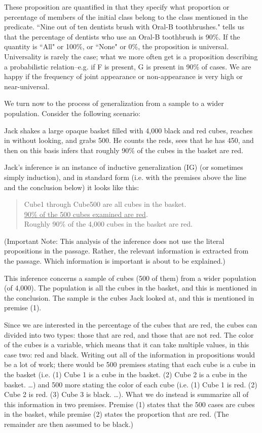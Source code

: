 These proposition are quantified in that they specify what proportion or percentage of members of the initial class belong to the class 
mentioned in the predicate. ``Nine out of ten dentists brush with Oral-B toothbrushes." tells us that the percentage of dentists who use an 
Oral-B toothbrush is 90\%. 
If the quantity is ``All" or 100\%, 
or ``None" or 0\%, 
the proposition is universal. Universality is rarely the case; 
what we more often get is a proposition describing a probabilistic relation--e.g. if F is present, G is present in 90\% 
of cases. We are happy 
if the frequency of joint appearance or non-appearance is very high or near-universal.

We turn now to the process of generalization from a sample to a wider population. Consider the following scenario:

Jack shakes a large opaque basket filled with 4,000 black and red cubes, reaches in without looking, and grabs 500. He counts the reds, sees 
that he has 450, and then on this basis infers that roughly 90\% 
of the cubes in the basket are red.

Jack's inference is an instance of inductive generalization (IG) (or sometimes simply induction), and in standard form (i.e. with the 
premises above the line and the conclusion below) it looks like this:

\begin{quote}
Cube1 through Cube500 are all cubes in the basket. \\
\underline{90\% of the 500 cubes examined are red}. \\
Roughly 90\% of the 4,000 cubes in the basket are red. \\
\end{quote}

(Important Note: This analysis of the inference does not use the literal propositions in the passage. Rather, the relevant information is 
extracted from the passage. Which information is important is about to be explained.)

This inference concerns a sample of cubes (500 of them) from a wider population (of 4,000). The population is all the cubes in the 
basket, and this is mentioned in the conclusion. The sample is the cubes Jack looked at, and this is mentioned in premise (1).

Since we are interested in the percentage of the cubes that are red, the cubes can divided into two types: those that are red, and those 
that are not red. The color of the cubes is a variable, which means that it can take multiple values, in this case two: red and black. 
Writing out all of the information in propositions would be a lot of work; there would be 500 premises stating that each cube 
is a cube in the basket (i.e. (1) Cube 1 is a cube in the basket. (2) Cube 2 is a cube in the basket. \dots ) and 500 more stating the color of 
each cube (i.e. (1) Cube 1 is red. (2) Cube 2 is red. (3) Cube 3 is black. \dots ). What we do instead is summarize all of this information in 
two premises. Premise (1) states that the 500 cases are cubes in the basket, while premise (2) states the proportion that are red. (The 
remainder are then assumed to be black.)

